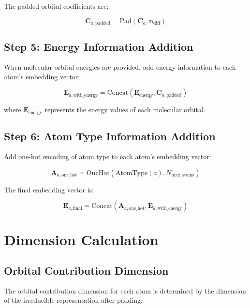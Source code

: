 \documentclass[12pt]{article}
\begin{document}
The padded orbital coefficients are:

\begin{equation}
\mathbf{C}_{a,\text{padded}} = \text{Pad}(\mathbf{C}_a, \mathbf{n}_{\text{diff}})
\end{equation}

\subsection{Step 5: Energy Information Addition}

When molecular orbital energies are provided, add energy information to each atom's embedding vector:

\begin{equation}
\mathbf{E}_{a,\text{with\_energy}} = \text{Concat}(\mathbf{E}_{\text{energy}}, \mathbf{C}_{a,\text{padded}})
\end{equation}

where $\mathbf{E}_{\text{energy}}$ represents the energy values of each molecular orbital.

\subsection{Step 6: Atom Type Information Addition}

Add one-hot encoding of atom type to each atom's embedding vector:

\begin{equation}
\mathbf{A}_{a,\text{one\_hot}} = \text{OneHot}(\text{AtomType}(a), N_{\text{max\_atoms}})
\end{equation}

The final embedding vector is:

\begin{equation}
\mathbf{E}_{a,\text{final}} = \text{Concat}(\mathbf{A}_{a,\text{one\_hot}}, \mathbf{E}_{a,\text{with\_energy}})
\end{equation}

\section{Dimension Calculation}

\subsection{Orbital Contribution Dimension}

The orbital contribution dimension for each atom is determined by the dimension of the irreducible representation after padding:
\end{document}
